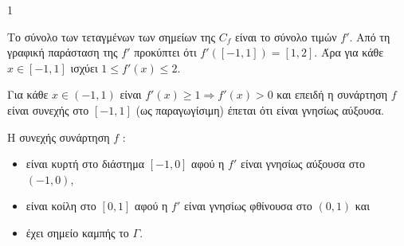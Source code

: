 \begin{ylh}{1}
    \item [ΛΥΣΗ]
\end{ylh}
\begin{alist}
\item Το σύνολο των τεταγμένων των σημείων της $C_f$ είναι το σύνολο τιμών $f'$. Από τη γραφική παράσταση της $f'$ προκύπτει ότι $f'([-1,1])=[1,2]$. Άρα για κάθε $x \in [-1,1]$ ισχύει $1 \le f'(x) \le 2$.
\item Για κάθε $x \in (-1,1)$ είναι $f'(x) \ge 1 \Rightarrow f'(x) > 0$ και επειδή η συνάρτηση $f$ είναι συνεχής στο $[-1,1]$ (ως παραγωγίσιμη) έπεται ότι είναι γνησίως αύξουσα.
\item Η συνεχής συνάρτηση $f$ :
\begin{itemize}
    \item[-] είναι κυρτή στο διάστημα $[-1,0]$ αφού η $f'$ είναι γνησίως αύξουσα στο $(-1,0)$,
    \item[-] είναι κοίλη στο $[0,1]$ αφού η $f'$ είναι γνησίως φθίνουσα στο $(0,1)$ και
    \item[-] έχει σημείο καμπής το $\Gamma$.
\end{itemize}
\end{alist}